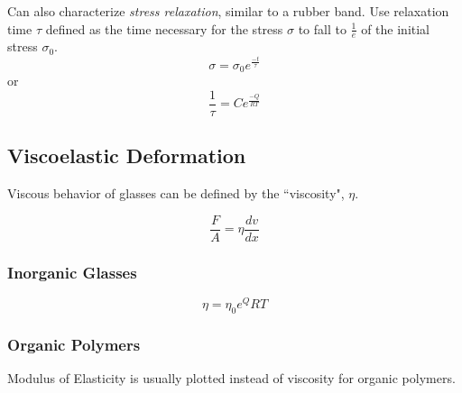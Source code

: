 \documentclass[10pt,letterpaper]{article}
\begin{document}
	Can also characterize \textit{stress relaxation}, similar to a rubber band.  Use relaxation time $\tau$ defined as the time necessary for the stress $\sigma$ to fall to $\frac{1}{e}$ of the initial stress $\sigma_0$. 
	$$
	\sigma = \sigma_0 e^{\frac{-t}{\tau}}
	$$
	or
	$$
	\frac{1}{\tau} = Ce^{\frac{-Q}{RT}}
	$$
	
	\subsection{Viscoelastic Deformation}
	Viscous behavior of glasses can be defined by the ``viscosity", $\eta$. 
	
	$$
	\frac{F}{A} = \eta \frac{dv}{dx}
	$$
	
	\subsubsection*{Inorganic Glasses}
	$$
	\eta = \eta_0 e^{Q}{RT}
	$$
	
	\subsubsection*{Organic Polymers}
	Modulus of Elasticity is usually plotted instead of viscosity for organic polymers. 
	
\end{document}
